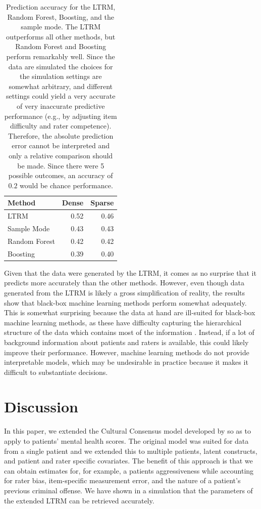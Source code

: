 \documentclass[a4paper]{article}
\begin{document}
\begin{table}[!ht]
	\centering
	\caption{Prediction accuracy for the LTRM, Random Forest, Boosting, and the sample mode. The LTRM outperforms all other methods, but Random Forest and Boosting perform remarkably well. Since the data are simulated the choices for the simulation settings are somewhat arbitrary, and different settings could yield a very accurate of very inaccurate predictive performance (e.g., by adjusting item difficulty and rater competence). Therefore, the absolute prediction error cannot be interpreted and only a relative comparison should be made. Since there were 5 possible outcomes, an accuracy of $0.2$ would be chance performance.}
	\begin{tabular}{lrr}
		\toprule
		Method        & Dense & Sparse \\
		\midrule
		LTRM          & 0.52  & 0.46 \\
		Sample Mode   & 0.43  & 0.43 \\
		Random Forest & 0.42  & 0.42 \\
		Boosting      & 0.39  & 0.40 \\
		\bottomrule
	\end{tabular}
\end{table}
Given that the data were generated by the LTRM, it comes as no surprise that it predicts more accurately than the other methods. However, even though data generated from the LTRM is likely a gross simplification of reality, the results show that black-box machine learning methods perform somewhat adequately. This is somewhat surprising because the data at hand are ill-suited for black-box machine learning methods, as these have difficulty capturing the hierarchical structure of the data which contains most of the information \cite<but see>{hajjem2014mixed}. Instead, if a lot of background information about patients and raters is available, this could likely improve their performance. However, machine learning methods do not provide interpretable models, which may be undesirable in practice because it makes it difficult to substantiate decisions. 
 
\section*{Discussion}

In this paper, we extended the Cultural Consensus model developed by  so as to apply to patients' mental health scores. The original model was suited for data from a single patient and we extended this to multiple patients, latent constructs, and patient and rater specific covariates. The benefit of this approach is that we can obtain estimates for, for example, a patients aggressiveness while accounting for rater bias, item-specific measurement error, and the nature of a patient's previous criminal offense. We have shown in a simulation that the parameters of the extended LTRM can be retrieved accurately.
\end{document}
